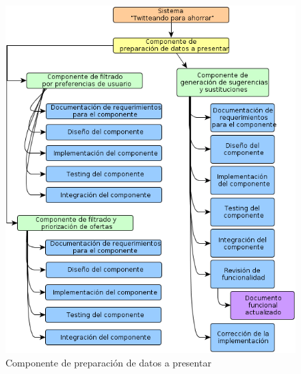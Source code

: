 \begin{figure}[H]
\centering
\includegraphics[width=\textwidth]{graficos/wbs/com_prep_de_datos.png}
\caption{Componente de preparación de datos a presentar}
\end{figure}

